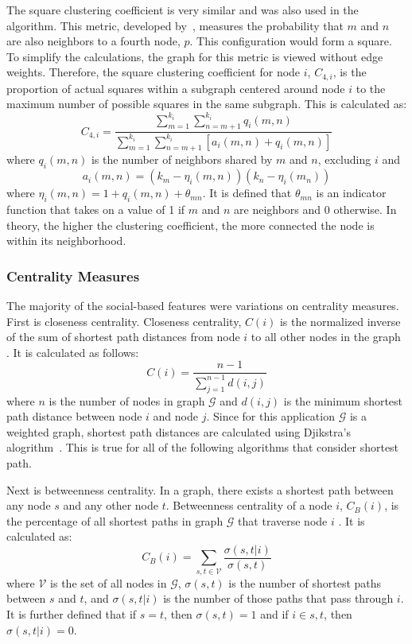 \documentclass[12pt]{report}
\begin{document}
The square clustering coefficient is very similar and was also used in the algorithm.
This metric, developed by~\cite{lind_cycles_2005}, measures the probability that $m$ and $n$ are also neighbors to a fourth node, $p$.
This configuration would form a square.
To simplify the calculations, the graph for this metric is viewed without edge weights.
Therefore, the square clustering coefficient for node $i$, $C_{4,i}$, is the proportion of actual squares within a subgraph centered around node $i$ to the maximum number of possible squares in the same subgraph.
This is calculated as:
\begin{equation}
C_{4,i} = \frac{\sum_{m=1}^{k_i}\sum_{n=m+1}^{k_i}q_i(m,n)}{\sum_{m=1}^{k_i} \sum_{n=m+1}^{k_i}\left[a_i(m,n)+q_i(m,n) \right]}
\end{equation}
where $q_i(m,n)$ is the number of neighbors shared by $m$ and $n$, excluding $i$ and 
\begin{equation}
a_i(m,n) = (k_m-\eta_i(m,n))(k_n-\eta_i(m_n)) 
\end{equation}
where $\eta_i(m,n) = 1+q_i(m,n)+\theta_{mn}$.  
It is defined that $\theta_{mn}$ is an indicator function that takes on a value of 1 if $m$ and $n$ are neighbors and 0 otherwise.
In theory, the higher the clustering coefficient, the more connected the node is within its neighborhood.

\subsubsection{Centrality Measures}
The majority of the social-based features were variations on centrality measures.
First is closeness centrality.
Closeness centrality, $C(i)$ is the normalized inverse of the sum of shortest path distances from node $i$ to all other nodes in the graph \cite{freeman_centrality_1978}.  It is calculated as follows:
\begin{equation}
C(i) = \frac{n-1}{\sum_{j=1}^{n-1}d(i,j)}
\end{equation}
where $n$ is the number of nodes in graph $\mathcal{G}$ and $d(i,j)$ is the minimum shortest path distance between node $i$ and node $j$.
Since for this application $\mathcal{G}$ is a weighted graph, shortest path distances are calculated using Djikstra's alogrithm~\cite{dijkstra1959note}.
This is true for all of the following algorithms that consider shortest path.

Next is betweenness centrality.
In a graph, there exists a shortest path between any node $s$ and any other node $t$.  Betweenness centrality of a node $i$, $C_B(i)$, is the percentage of all shortest paths in graph $\mathcal{G}$ that traverse node $i$ \cite{freeman_set_1977}.
It is calculated as:
\begin{equation}
C_B(i) = \sum_{s,t\in \mathcal{V}}\frac{\sigma(s,t|i)}{\sigma(s,t)}
\end{equation}
where $\mathcal{V}$ is the set of all nodes in $\mathcal{G}$, $\sigma(s,t)$ is the number of shortest paths between $s$ and $t$, and $\sigma(s,t|i)$ is the number of those paths that pass through $i$.
It is further defined that if $s=t$, then $\sigma(s,t)=1$ and if $i\in s,t$, then $\sigma(s,t|i) = 0$.
\end{document}
